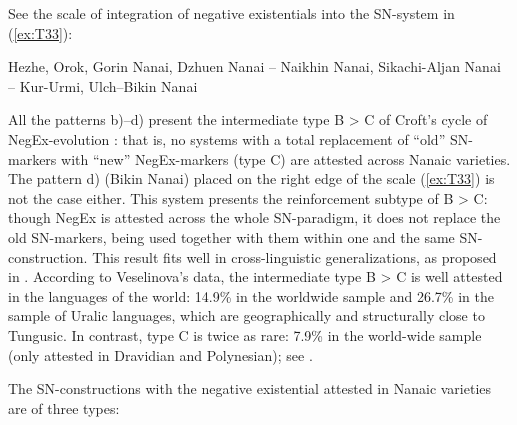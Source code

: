 \documentclass[output=paper]{langscibook}
\begin{document}
See the scale of integration of negative existentials into the SN-system in (\ref{ex:T33}):

\begin{exe}\label{ex:T33}
    \ex Hezhe, Orok, Gorin Nanai, Dzhuen Nanai – Naikhin Nanai, Sikachi-Aljan Nanai – Kur-Urmi, Ulch–Bikin Nanai
\end{exe}

All the patterns b)–d) present the intermediate type B > C of Croft’s cycle of NegEx-evolution \citeyearpar{Croft1991}: that is, no systems with a total replacement of “old” SN-markers with “new” NegEx-markers (type C) are attested across Nanaic varieties. The pattern d) (Bikin Nanai) placed on the right edge of the scale (\ref{ex:T33}) is not the case either. This system presents the reinforcement subtype of B > C: though NegEx is attested across the whole SN-paradigm, it does not replace the old SN-markers, being used together with them within one and the same SN-construction. This result fits well in cross-linguistic generalizations, as proposed in \citet{Veselinova2016}. According to Veselinova’s data, the intermediate type B > C is well attested in the languages of the world: 14.9\% in the worldwide sample and 26.7\% in the sample of Uralic languages, which are geographically and structurally close to Tungusic. In contrast, type C is twice as rare: 7.9\% in the world-wide sample (only attested in Dravidian and Polynesian); see \citet[150]{Veselinova2016}.

The SN-constructions with the negative existential attested in Nanaic varieties are of three types:
\end{document}

